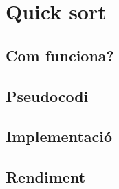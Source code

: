 \chapter{Quick sort}

\section{Com funciona?}
\section{Pseudocodi}
\section{Implementació}

\section{Rendiment}
